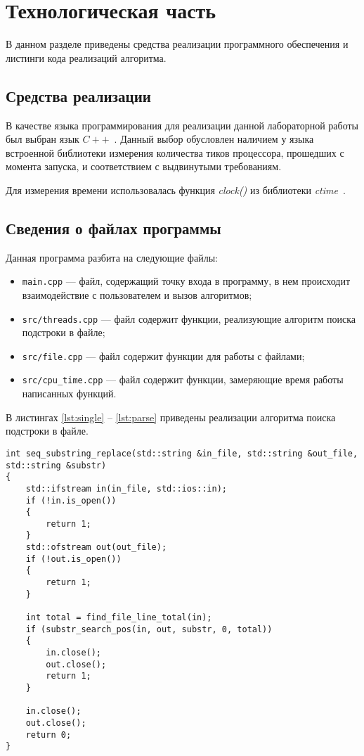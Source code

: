 \chapter{Технологическая часть}

В данном разделе приведены средства реализации программного обеспечения и листинги кода реализаций алгоритма.

\section{Средства реализации}

В качестве языка программирования для реализации данной лабораторной работы был выбран язык $C++$~\cite{cpp-lang}.
Данный выбор обусловлен наличием у языка встроенной библиотеки измерения количества тиков процессора, прошедших с момента запуска, и соответствием с выдвинутыми требованиям.

Для измерения времени использовалась функция \textit{clock()} из библиотеки \textit{ctime}~\cite{cpp-lang-time}.

\clearpage

\section{Сведения о файлах программы}

Данная программа разбита на следующие файлы:

\begin{itemize}[label=---]
	\item \texttt{main.cpp} --- файл, содержащий точку входа в программу, в нем происходит взаимодействие с пользователем и вызов алгоритмов;
	\item \texttt{src/threads.cpp} --- файл содержит функции, реализующие алгоритм поиска подстроки в файле;
	\item \texttt{src/file.cpp} --- файл содержит функции для работы с файлами;
	\item \texttt{src/cpu\_time.cpp} --- файл содержит функции, замеряющие время работы написанных функций.
\end{itemize}

В листингах \ref{lst:single} -- \ref{lst:parse} приведены реализации алгоритма поиска подстроки в файле.

\clearpage

\begin{lstlisting}[label=lst:single,caption=Функция поиска подстроки в файле с одним потоком.]
int seq_substring_replace(std::string &in_file, std::string &out_file, std::string &substr)
{
	std::ifstream in(in_file, std::ios::in);
	if (!in.is_open())
	{
		return 1;
	}
	std::ofstream out(out_file);
	if (!out.is_open())
	{
		return 1;
	}

	int total = find_file_line_total(in);
	if (substr_search_pos(in, out, substr, 0, total))
	{
		in.close();
		out.close();
		return 1;
	}

	in.close();
	out.close();
	return 0;
}
\end{lstlisting}

